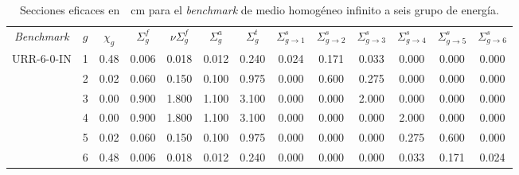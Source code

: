 \documentclass[11pt]{article}
\numberwithin{equation}{section}
\begin{document}
{
\begin{table}[h!]
\begin{center}
\begin{tabular}{ccccccccccccc}
\small \emph{Benchmark}  & \small $g$ & \small $\chi_g$ & \small $\Sigma^{f}_g$ & \small $\nu\Sigma^{f}_g$ & \small $\Sigma^{a}_g$ & \small $\Sigma^{t}_g$ & \small $\Sigma^s_{g \rightarrow 1}$ & \small $\Sigma^s_{g \rightarrow 2}$ & \small $\Sigma^s_{g \rightarrow 3}$ & \small $\Sigma^s_{g \rightarrow 4}$ & \small $\Sigma^s_{g \rightarrow 5}$ & \small $\Sigma^s_{g \rightarrow 6}$ \\
\small{URR-6-0-IN} & \tiny \num{1} & \tiny \num{0.48} & \tiny \num{0.006} & \tiny \num{0.018} & \tiny \num{0.012} & \tiny \num{0.240} & \tiny \num{0.024} & \tiny \num{0.171} & \tiny \num{0.033} & \tiny \num{0.000} & \tiny \num{0.000} & \tiny \num{0.000} \\
           & \tiny \num{2} & \tiny \num{0.02} & \tiny \num{0.060} & \tiny \num{0.150} & \tiny \num{0.100} & \tiny \num{0.975} & \tiny \num{0.000} & \tiny \num{0.600} & \tiny \num{0.275} & \tiny \num{0.000} & \tiny \num{0.000} & \tiny \num{0.000} \\
           & \tiny \num{3} & \tiny \num{0.00} & \tiny \num{0.900} & \tiny \num{1.800} & \tiny \num{1.100} & \tiny \num{3.100} & \tiny \num{0.000} & \tiny \num{0.000} & \tiny \num{2.000} & \tiny \num{0.000} & \tiny \num{0.000} & \tiny \num{0.000} \\
           & \tiny \num{4} & \tiny \num{0.00} & \tiny \num{0.900} & \tiny \num{1.800} & \tiny \num{1.100} & \tiny \num{3.100} & \tiny \num{0.000} & \tiny \num{0.000} & \tiny \num{0.000} & \tiny \num{2.000} & \tiny \num{0.000} & \tiny \num{0.000} \\
           & \tiny \num{5} & \tiny \num{0.02} & \tiny \num{0.060} & \tiny \num{0.150} & \tiny \num{0.100} & \tiny \num{0.975} & \tiny \num{0.000} & \tiny \num{0.000} & \tiny \num{0.000} & \tiny \num{0.275} & \tiny \num{0.600} & \tiny \num{0.000} \\
           & \tiny \num{6} & \tiny \num{0.48} & \tiny \num{0.006} & \tiny \num{0.018} & \tiny \num{0.012} & \tiny \num{0.240} & \tiny \num{0.000} & \tiny \num{0.000} & \tiny \num{0.000} & \tiny \num{0.033} & \tiny \num{0.171} & \tiny \num{0.024} 
\end{tabular}
\caption{\label{tabla:xs-urr} Secciones eficaces en~\si{\per\centi\metre} para el \emph{benchmark} de medio homogéneo infinito a seis grupo de energía.}
\end{center}
\end{table}
}
\end{document}
